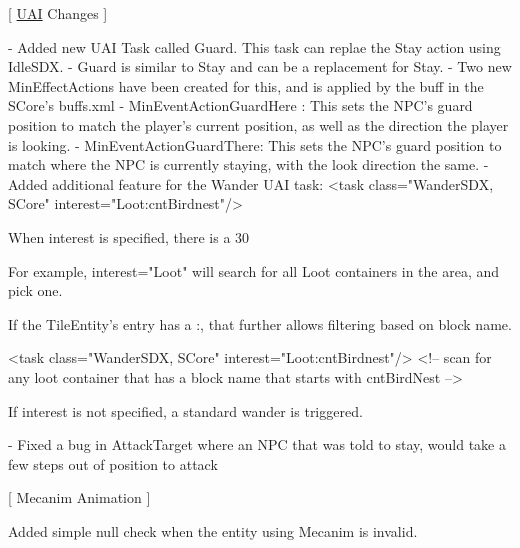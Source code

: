 \mbox{[} \mbox{\hyperlink{namespace_u_a_i}{UAI}} Changes \mbox{]} \begin{DoxyVerb}- Added new UAI Task called Guard. This task can replae the Stay action using IdleSDX.
    - Guard is similar to Stay and can be a replacement for Stay.
    - Two new MinEffectActions have been created for this, and is applied by the buff in the SCore's buffs.xml
        - MinEventActionGuardHere : This sets the NPC's guard position to match the player's current position, as well as the direction the player is looking.
        - MinEventActionGuardThere: This sets the NPC's guard position to match where the NPC is currently staying, with the look direction the same.
- Added additional feature for the Wander UAI task:
    <task class="WanderSDX, SCore" interest="Loot:cntBirdnest"/>

    When interest is specified, there is a 30%

    For example, interest="Loot" will search for all Loot containers in the area, and pick one.

    If the TileEntity's entry has a :, that further allows filtering based on block name.

        <task class="WanderSDX, SCore" interest="Loot:cntBirdnest"/> <!-- scan for any loot container that has a block name that starts with cntBirdNest -->


    If interest is not specified, a standard wander is triggered.

- Fixed a bug in AttackTarget where an NPC that was told to stay, would take a few steps out of position to attack
\end{DoxyVerb}
 \mbox{[} Mecanim Animation \mbox{]}
\begin{DoxyItemize}
\item Added simple null check when the entity using Mecanim is invalid. 
\end{DoxyItemize}